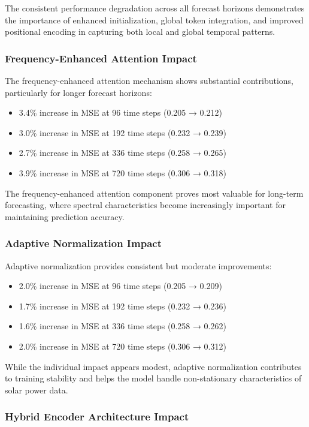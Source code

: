 \documentclass[12pt]{uomthesis}
\begin{document}
The consistent performance degradation across all forecast horizons demonstrates the importance of enhanced initialization, global token integration, and improved positional encoding in capturing both local and global temporal patterns.

\subsubsection{Frequency-Enhanced Attention Impact}

The frequency-enhanced attention mechanism shows substantial contributions, particularly for longer forecast horizons:
\begin{itemize}
\item 3.4\% increase in MSE at 96 time steps (0.205 → 0.212)
\item 3.0\% increase in MSE at 192 time steps (0.232 → 0.239)
\item 2.7\% increase in MSE at 336 time steps (0.258 → 0.265)
\item 3.9\% increase in MSE at 720 time steps (0.306 → 0.318)
\end{itemize}

The frequency-enhanced attention component proves most valuable for long-term forecasting, where spectral characteristics become increasingly important for maintaining prediction accuracy.

\subsubsection{Adaptive Normalization Impact}

Adaptive normalization provides consistent but moderate improvements:
\begin{itemize}
\item 2.0\% increase in MSE at 96 time steps (0.205 → 0.209)
\item 1.7\% increase in MSE at 192 time steps (0.232 → 0.236)
\item 1.6\% increase in MSE at 336 time steps (0.258 → 0.262)
\item 2.0\% increase in MSE at 720 time steps (0.306 → 0.312)
\end{itemize}

While the individual impact appears modest, adaptive normalization contributes to training stability and helps the model handle non-stationary characteristics of solar power data.

\subsubsection{Hybrid Encoder Architecture Impact}
\end{document}
